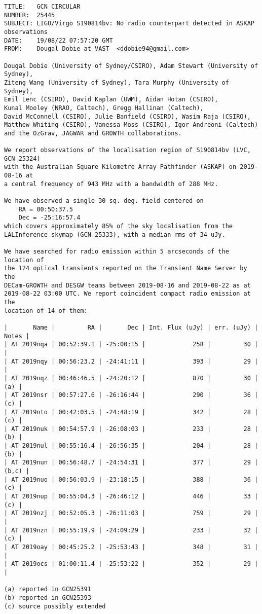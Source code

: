 \pagebreak
{}
\begin{verbatim}
TITLE:   GCN CIRCULAR
NUMBER:  25445
SUBJECT: LIGO/Virgo S190814bv: No radio counterpart detected in ASKAP observations
DATE:    19/08/22 07:57:20 GMT
FROM:    Dougal Dobie at VAST  <ddobie94@gmail.com>

Dougal Dobie (University of Sydney/CSIRO), Adam Stewart (University of Sydney),
Ziteng Wang (University of Sydney), Tara Murphy (University of Sydney),
Emil Lenc (CSIRO), David Kaplan (UWM), Aidan Hotan (CSIRO),
Kunal Mooley (NRAO, Caltech), Gregg Hallinan (Caltech),
David McConnell (CSIRO), Julie Banfield (CSIRO), Wasim Raja (CSIRO),
Matthew Whiting (CSIRO), Vanessa Moss (CSIRO), Igor Andreoni (Caltech)
and the OzGrav, JAGWAR and GROWTH collaborations.

We report observations of the localisation region of S190814bv (LVC, GCN 25324)
with the Australian Square Kilometre Array Pathfinder (ASKAP) on 2019-08-16 at
a central frequency of 943 MHz with a bandwidth of 288 MHz.

We have observed a single 30 sq. deg. field centered on
    RA = 00:50:37.5
    Dec = -25:16:57.4
which covers approximately 85% of the sky localisation from the
LALInference skymap (GCN 25333), with a median rms of 34 uJy.

We have searched for radio emission within 5 arcseconds of the location of
the 124 optical transients reported on the Transient Name Server by the
DECam-GROWTH and DESGW teams between 2019-08-16 and 2019-08-22 as at
2019-08-22 03:00 UTC. We report coincident compact radio emission at the
location of 14 of them:

|       Name |         RA |       Dec | Int. Flux (uJy) | err. (uJy) | Notes |
| AT 2019nqa | 00:52:39.1 | -25:00:15 |             258 |         30 |       |
| AT 2019nqy | 00:56:23.2 | -24:41:11 |             393 |         29 |       |
| AT 2019nqz | 00:46:46.5 | -24:20:12 |             870 |         30 |   (a) |
| AT 2019nsr | 00:57:27.6 | -26:16:44 |             290 |         36 |   (c) |
| AT 2019nto | 00:42:03.5 | -24:48:19 |             342 |         28 |   (c) |
| AT 2019nuk | 00:54:57.9 | -26:08:03 |             233 |         28 |   (b) |
| AT 2019nul | 00:55:16.4 | -26:56:35 |             204 |         28 |   (b) |
| AT 2019nun | 00:56:48.7 | -24:54:31 |             377 |         29 | (b,c) |
| AT 2019nuo | 00:56:03.9 | -23:18:15 |             388 |         36 |   (c) |
| AT 2019nup | 00:55:04.3 | -26:46:12 |             446 |         33 |   (c) |
| AT 2019nzj | 00:52:05.3 | -26:11:03 |             759 |         29 |       |
| AT 2019nzn | 00:55:19.9 | -24:09:29 |             233 |         32 |   (c) |
| AT 2019oay | 00:45:25.2 | -25:53:43 |             348 |         31 |       |
| AT 2019ocs | 01:00:11.4 | -25:53:22 |             352 |         29 |       |

(a) reported in GCN25391
(b) reported in GCN25393
(c) source possibly extended
\end{verbatim}
